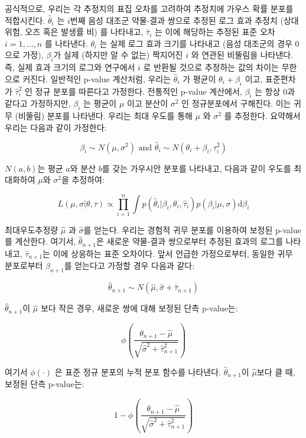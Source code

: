 \documentclass[11pt]{book}
\theoremstyle{definition}
\theoremstyle{definition}
\theoremstyle{definition}
\theoremstyle{remark}
\begin{document}
공식적으로, 우리는 각 추정치의 표집 오차를 고려하여 추정치에 가우스 확률
분포를 적합시킨다. \(\hat{\theta}_i\) 는 \(i\)번째 음성 대조군 약물-결과
쌍으로 추정된 로그 효과 추정치 (상대 위험, 오즈 혹은 발생률 비) 를
나타내고, \(\hat{\tau}_i\) 는 이에 해당하는 추정된 표준 오차
\(i=1,\ldots,n\) 를 나타낸다. \(\theta_i\) 는 실제 로그 효과 크기를
나타내고 (음성 대조군의 경우 0으로 가정), \(\beta_i\)가 실제 (하지만 알
수 없는) 짝지어진 \(i\) 와 연관된 비뚤림을 나타낸다. 즉, 실제 효과
크기의 로그와 연구에서 \(i\) 로 반환될 것으로 추정하는 값의 차이는
무한으로 커진다. 일반적인 p-value 계산처럼, 우리는 \(\hat{\theta}_i\) 가
평균이 \(\theta_i + \beta_i\) 이고, 표준편차가 \(\hat{\tau}_i^2\) 인
정규 분포를 따른다고 가정한다. 전통적인 p-value 계산에서, \(\beta_i\) 는
항상 0과 같다고 가정하지만, \(\beta_i\) 는 평균이 \(\mu\) 이고 분산이
\(\sigma^2\) 인 정규분포에서 구해진다. 이는 귀무 (비뚤림) 분포를
나타낸다. 우리는 최대 우도를 통해 \(\mu\) 와 \(\sigma^2\) 를 추정한다.
요약해서 우리는 다음과 같이 가정한다:

\[\beta_i \sim N(\mu,\sigma^2) \text{  and  } \hat{\theta}_i \sim N(\theta_i + \beta_i, \tau_i^2)\]

\(N(a,b)\)는 평균 \(a\)와 분산 \(b\)를 갖는 가우시안 분포를 나타내고,
다음과 같이 우도를 최대화하여 \(\mu\)와 \(\sigma^2\)을 추정하여:

\[L(\mu, \sigma | \theta, \tau) \propto \prod_{i=1}^{n}\int p(\hat{\theta}_i|\beta_i, \theta_i, \hat{\tau}_i)p(\beta_i|\mu, \sigma) \text{d}\beta_i\]

최대우도추정량 \(\hat{\mu}\) 과 \(\hat{\sigma}\)를 얻는다. 우리는 경험적
귀무 분포를 이용하여 보정된 p-value를 계산한다. 여기서,
\(\hat{\theta}_{n+1}\)은 새로운 약물-결과 쌍으로부터 추정된 효과의
로그를 나타내고, \(\hat{\tau}_{n+1}\)는 이에 상응하는 표준 오차이다.
앞서 언급한 가정으로부터, 동일한 귀무 분포로부터 \(\beta_{n+1}\)를
얻는다고 가정할 경우 다음과 같다:

\[\hat{\theta}_{n+1} \sim N(\hat{\mu}, \hat{\sigma} + \hat{\tau}_{n+1})\]

\(\hat{\theta}_{n+1}\)이 \(\hat{\mu}\) 보다 작은 경우, 새로운 쌍에 대해
보정된 단측 p-value는:

\[\phi\left(\frac{\theta_{n+1} - \hat{\mu}}{\sqrt{\hat{\sigma}^2 + \hat{\tau}_{n+1}^2}}\right)\]

여기서 \(\phi(\cdot)\) 은 표준 정규 분포의 누적 분포 함수를 나타낸다.
\(\hat{\theta}_{n+1}\)이 \(\hat{\mu}\)보다 클 때, 보정된 단측 p-value는:

\[1-\phi\left(\frac{\theta_{n+1} - \hat{\mu}}{\sqrt{\hat{\sigma}^2 + \hat{\tau}_{n+1}^2}}\right)\]
\end{document}
